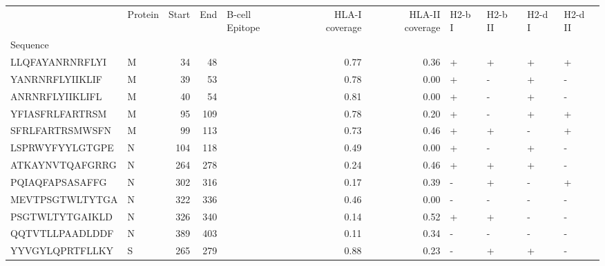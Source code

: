 \begin{tabular}{llrrlrrllll}
\toprule
{} & Protein &  Start &   End &     B-cell Epitope &  HLA-I coverage &  HLA-II coverage & H2-b I & H2-b II & H2-d I & H2-d II \\
Sequence        &         &        &       &                    &                 &                  &        &         &        &         \\
\midrule
LLQFAYANRNRFLYI &       M &     34 &    48 &                    &            0.77 &             0.36 &      + &       + &      + &       + \\
YANRNRFLYIIKLIF &       M &     39 &    53 &                    &            0.78 &             0.00 &      + &       - &      + &       - \\
ANRNRFLYIIKLIFL &       M &     40 &    54 &                    &            0.81 &             0.00 &      + &       - &      + &       - \\
YFIASFRLFARTRSM &       M &     95 &   109 &                    &            0.78 &             0.20 &      + &       - &      + &       + \\
SFRLFARTRSMWSFN &       M &     99 &   113 &                    &            0.73 &             0.46 &      + &       + &      - &       + \\
LSPRWYFYYLGTGPE &       N &    104 &   118 &                    &            0.49 &             0.00 &      + &       - &      + &       - \\
ATKAYNVTQAFGRRG &       N &    264 &   278 &                    &            0.24 &             0.46 &      + &       + &      + &       - \\
PQIAQFAPSASAFFG &       N &    302 &   316 &                    &            0.17 &             0.39 &      - &       + &      - &       + \\
MEVTPSGTWLTYTGA &       N &    322 &   336 &                    &            0.46 &             0.00 &      - &       - &      - &       - \\
PSGTWLTYTGAIKLD &       N &    326 &   340 &                    &            0.14 &             0.52 &      + &       + &      - &       - \\
QQTVTLLPAADLDDF &       N &    389 &   403 &                    &            0.11 &             0.34 &      - &       - &      - &       - \\
YYVGYLQPRTFLLKY &       S &    265 &   279 &                    &            0.88 &             0.23 &      - &       + &      + &       - \\

\end{tabular}
